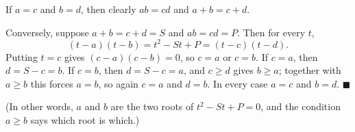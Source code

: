 If $a=c$ and $b=d$, then clearly $ab=cd$ and $a+b=c+d$.

Conversely, suppose $a+b=c+d=S$ and $ab=cd=P$. Then for every $t$,
\[
(t-a)(t-b)=t^2-St+P=(t-c)(t-d).
\]
Putting $t=c$ gives $(c-a)(c-b)=0$, so $c=a$ or $c=b$. If $c=a$, then $d=S-c=b$. If $c=b$, then $d=S-c=a$, and $c\ge d$ gives $b\ge a$; together with $a\ge b$ this forces $a=b$, so again $c=a$ and $d=b$. In every case $a=c$ and $b=d$. $\blacksquare$

(In other words, $a$ and $b$ are the two roots of $t^2-St+P=0$, and the condition $a\ge b$ says which root is which.)
